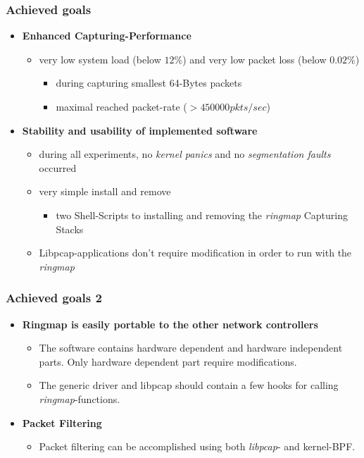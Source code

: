 \begin{frame}
\frametitle{Achieved goals}
\begin{itemize}
	\item \textbf{Enhanced Capturing-Performance}
		\begin{itemize}
			\item very low  system load (below $12\%$) and very low
				packet loss  (below  $0.02\%$)
				\begin{itemize}
					\item during capturing smallest  64-Bytes packets
					\item maximal reached packet-rate ($ > 450000 pkts/sec$)
				\end{itemize}
		\end{itemize}
	\item \textbf{Stability and usability of implemented software}
		\begin{itemize}
			\item during all experiments, no \emph{kernel panics} and no \emph{segmentation faults} occurred
			\item very simple install and remove
				\begin{itemize}
					\item two Shell-Scripts to installing  and removing the   
						\emph{ringmap} Capturing Stacks
				\end{itemize}
			\item Libpcap-applications don't require modification in order to run with the \emph{ringmap}
		\end{itemize}
\end{itemize}
\end{frame}

\begin{frame}
\frametitle{Achieved goals 2}
\begin{itemize}
	\item \textbf{Ringmap is easily portable to the other network controllers}
		\begin{itemize}
			\item The software contains hardware dependent and hardware
				independent parts. Only hardware dependent part require
				modifications.
			\item The generic driver and libpcap should contain a few hooks for calling
				\emph{ringmap}-functions.
		\end{itemize}
	\item \textbf{Packet Filtering}
		\begin{itemize}
			\item Packet filtering can be accomplished using both
				\emph{libpcap}- and kernel-BPF.
		\end{itemize}
\end{itemize}
\end{frame}

